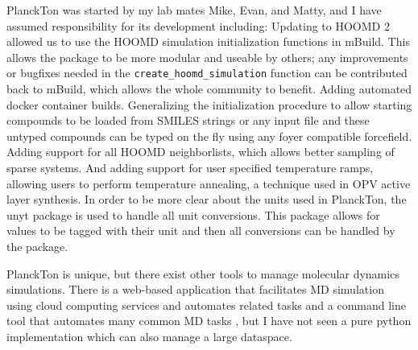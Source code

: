 PlanckTon was started by my lab mates Mike, Evan, and Matty, and I have assumed responsibility for its development including:
Updating to HOOMD 2 allowed us to use the HOOMD simulation initialization functions in mBuild. This allows the package to be more modular and useable by others; any improvements or bugfixes needed in the \lstinline{create_hoomd_simulation} function can be contributed back to mBuild, which allows the whole community to benefit.
Adding automated docker container builds.
Generalizing the initialization procedure to allow starting compounds to be loaded from SMILES strings or any input file and these untyped compounds can be typed on the fly using any foyer compatible forcefield.
Adding support for all HOOMD neighborlists, which allows better sampling of sparse systems. 
And adding support for user specified temperature ramps, allowing users to perform temperature annealing, a technique used in OPV active layer synthesis.
In order to be more clear about the units used in PlanckTon, the unyt package is used to handle all unit conversions. This package allows for values to be tagged with their unit and then all conversions can be handled by the package.

PlanckTon is unique, but there exist other tools to manage molecular dynamics simulations. There is a web-based application that facilitates MD simulation using cloud computing services and automates related tasks \citep{Nicolas-Barreales2021} and a command line tool that automates many common MD tasks \citep{Rackers2018}, but I have not seen a pure python implementation which can also manage a large dataspace.

